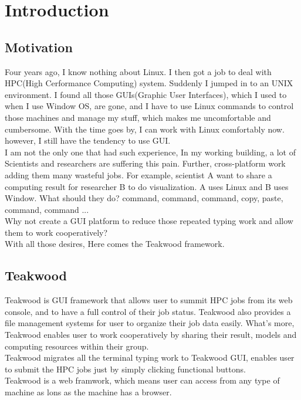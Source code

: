 \chapter{Introduction}

\section{Motivation}
Four years ago, I know nothing about Linux. I then got a job to deal with HPC(High Cerformance Computing) system. Suddenly I jumped in to an UNIX environment. I found all those GUIs(Graphic User Interfaces), which I used to when I use Window OS, are gone, and I have to use Linux commands to control those machines and manage my stuff, which makes me uncomfortable and cumbersome. With the time goes by, I can work with Linux comfortably now. however, I still have the tendency to use GUI.\\I am not the only one that had such experience, In my working building, a lot of Scientists and researchers are suffering this pain. Further, cross-platform work adding them many wasteful jobs. For example, scientist A want to share a computing result for researcher B to do visualization. A uses Linux and B uses Window. What should they do? command, command, command, copy, paste, command, command ...\\Why not create a GUI platform to reduce those repeated typing work and allow them to work cooperatively?\\With all those desires, Here comes the Teakwood framework.

\section{Teakwood}
Teakwood is GUI framework that allows user to summit HPC jobs from its web console, and to have a full control of their job status. Teakwood also provides a file management systems for user to organize their job data easily. What's more, Teakwood enables user to work cooperatively by sharing their result, models and computing resources within their group. \\Teakwood migrates all the terminal typing work to Teakwood GUI, enables user to submit the HPC jobs just by simply clicking functional buttons.\\Teakwood is a web framwork, which means user can access from any type of machine as lons as the machine has a browser.

